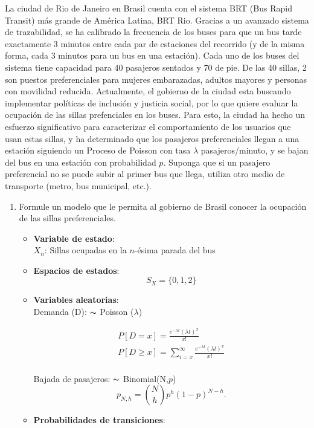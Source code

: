 
La ciudad de Rio de Janeiro en Brasil cuenta con el sistema BRT (Bus Rapid Transit) más grande de América Latina, BRT  Rio. Gracias a un avanzado sistema de trazabilidad, se ha calibrado la frecuencia de los buses para que un bus tarde exactamente 3 minutos entre cada par de estaciones del recorrido (y de la misma forma, cada 3 minutos para un bus en una estación). Cada uno de los buses del sistema tiene capacidad para 40 pasajeros sentados y 70 de pie. De las 40 sillas, 2 son puestos preferenciales para mujeres embarazadas, adultos mayores y personas con movilidad reducida.
Actualmente, el gobierno de la ciudad esta buscando implementar políticas de inclusión y justicia social, por lo que quiere evaluar la ocupación de las sillas prefenciales en los buses. Para esto, la ciudad ha hecho un esfuerzo significativo para caracterizar el comportamiento de los usuarios que usan estas sillas, y ha determinado que los pasajeros preferenciales llegan a una estación siguiendo un Proceso de Poisson con tasa $\lambda$ pasajeros/minuto, y se bajan del bus en una estación con probabilidad $p$. Suponga que si un pasajero preferencial no se puede subir al primer bus que llega, utiliza otro medio de transporte (metro, bus municipal, etc.).


\begin{enumerate}
    \item Formule un modelo que le permita al gobierno de Brasil conocer la ocupación de las sillas preferenciales. 

    \begin{itemize}
    	\item[] \textbf{Variable de estado}:\\
    	$X_n$: Sillas ocupadas en la $n$-ésima parada del bus\\
    		
    	\item[] \textbf{Espacios de estados}:\\
            \[S_X=\{0,1,2\}\]

    	\item[] \textbf{Variables aleatorias}:\\
            Demanda (D): $\thicksim$ Poisson ($\lambda$)

            \begin{align*} 
                P[D=x]=\frac{e^{-\lambda t}(\lambda t)^{x}}{x!}\\
                P[D\geq x]=\sum_{i=x}^\infty \frac{e^{-\lambda t }(\lambda t) ^x}{x!}
            \end{align*}\\
            Bajada de pasajeros: $\thicksim$ Binomial(N,$p$) \
            \[
            p_{N,h} = \binom{N}{h} p^h (1-p)^{N-h}. 
            \]

            \item[] \textbf{Probabilidades de transiciones}:\
           
    
    \end{itemize}

\end{enumerate}


